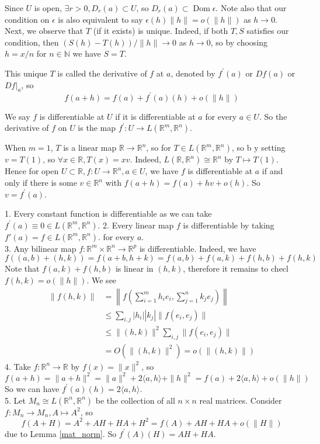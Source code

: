 Since $U$ is open, $\exists r>0, D_r(a)\subset U$, so $D_r(a)\subset \operatorname{Dom}\epsilon$.
Note also that our condition on $\epsilon$ is also equivalent to say $\epsilon(h)\|h\|=o(\|h\|)$ as $h\to 0$.\\
Next, we observe that $T$ (if it exists) is unique.
Indeed, if both $T,S$ satisfies our condition, then $(S(h)-T(h))/\|h\|\to 0$ as $h\to 0$, so by choosing $h=x/n$ for $n\in\mathbb N$ we have $S=T$.
\begin{definition}
    This unique $T$ is called the derivative of $f$ at $a$, denoted by $f^\prime(a)$ or $Df(a)$ or $Df|_a$, so
    $$f(a+h)=f(a)+f^\prime(a)(h)+o(\|h\|)$$
\end{definition}
\begin{definition}
    We say $f$ is differentiable at $U$ if it is differentiable at $a$ for every $a\in U$.
    So the derivative of $f$ on $U$ is the map $f^\prime:U\to L(\mathbb R^m,\mathbb R^n)$.
\end{definition}
\begin{remark}
    When $m=1$, $T$ is a linear map $\mathbb R\to\mathbb R^n$, so for $T\in L(\mathbb R^m,\mathbb R^n)$, so b y setting $v=T(1)$, so $\forall x\in\mathbb R,T(x)=xv$.
    Indeed, $L(\mathbb R,\mathbb R^n)\cong\mathbb R^n$ by $T\mapsto T(1)$.
    Hence for open $U\subset\mathbb R,f:U\to\mathbb R^n,a\in U$, we have $f$ is differentiable at $a$ if and only if there is some $v\in\mathbb R^n$ with $f(a+h)=f(a)+hv+o(h)$.
    So $v=f^\prime(a)$.
\end{remark}
\begin{example}
    1. Every constant function is differentiable as we can take $f^\prime(a)\equiv 0\in L(\mathbb R^m,\mathbb R^n)$.
    2. Every linear map $f$ is differentiable by taking $f'(a)=f\in L(\mathbb R^m,\mathbb R^n)$. for every $a$.\\
    3. Any bilinear map $f:\mathbb R^m\times\mathbb R^n\to\mathbb R^p$ is differentiable.
    Indeed, we have
    $$f((a,b)+(h,k))=f(a+b,h+k)=f(a,b)+f(a,k)+f(h,b)+f(h,k)$$
    Note that $f(a,k)+f(h,b)$ is linear in $(h,k)$, therefore it remains to checl $f(h,k)=o(\|h\|)$.
    We see
    \begin{align*}
        \|f(h,k)\|&=\left\|f\left( \sum_{i=1}^mh_ie_i, \sum_{j=1}^nk_je_j\right)\right\|\\
        &\le \sum_{i,j}|h_i||k_j|\|f(e_i,e_j)\|\\
        &\le \|(h,k)\|^2\sum_{i,j}\|f(e_i,e_j)\|\\
        &=O(\|(h,k)\|^2)=o(\|(h,k)\|)
    \end{align*}
    4. Take $f:\mathbb R^n\to\mathbb R$ by $f(x)=\|x\|^2$, so
    $$f(a+h)=\|a+h\|^2=\|a\|^2+2\langle a,h\rangle+\|h\|^2=f(a)+2\langle a,h\rangle+o(\|h\|)$$
    So we can have $f^\prime(a)(h)=2\langle a,h\rangle$.\\
    5. Let $M_n\cong L(\mathbb R^n,\mathbb R^n)$ be the collection of all $n\times n$ real matrices.
    Consider $f:M_n\to M_n, A\mapsto A^2$, so
    $$f(A+H)=A^2+AH+HA+H^2=f(A)+AH+HA+o(\|H\|)$$
    due to Lemma \ref{mat_norm}.
    So $f^\prime(A)(H)=AH+HA$.
\end{example}
